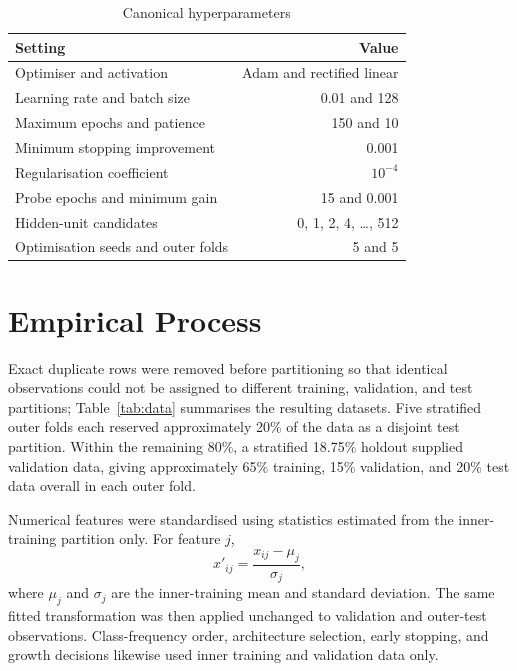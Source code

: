 \documentclass[conference,10pt]{IEEEtran}
\begin{document}
\begin{table}[t]
\caption{Canonical hyperparameters}
\label{tab:hyperparameters}\centering
\begin{tabular}{lr}\toprule
Setting & Value\\\midrule
Optimiser and activation & Adam and rectified linear\\
Learning rate and batch size & 0.01 and 128\\
Maximum epochs and patience & 150 and 10\\
Minimum stopping improvement & 0.001\\
Regularisation coefficient & $10^{-4}$\\
Probe epochs and minimum gain & 15 and 0.001\\
Hidden-unit candidates & 0, 1, 2, 4, \ldots, 512\\
Optimisation seeds and outer folds & 5 and 5\\\bottomrule
\end{tabular}
\end{table}


\section{Empirical Process}
Exact duplicate rows were removed before partitioning so that identical observations could not be assigned to different training, validation, and test partitions; Table~\ref{tab:data} summarises the resulting datasets. Five stratified outer folds each reserved approximately 20\% of the data as a disjoint test partition. Within the remaining 80\%, a stratified 18.75\% holdout supplied validation data, giving approximately 65\% training, 15\% validation, and 20\% test data overall in each outer fold.

Numerical features were standardised using statistics estimated from the inner-training partition only. For feature $j$,
\begin{equation}
 x'_{ij}=\frac{x_{ij}-\mu_j}{\sigma_j},
\end{equation}
where $\mu_j$ and $\sigma_j$ are the inner-training mean and standard deviation. The same fitted transformation was then applied unchanged to validation and outer-test observations. Class-frequency order, architecture selection, early stopping, and growth decisions likewise used inner training and validation data only.

\begin{table}[t]
\caption{Data after duplicate removal}
\label{tab:data}\centering
{}
\end{table}
\end{document}
